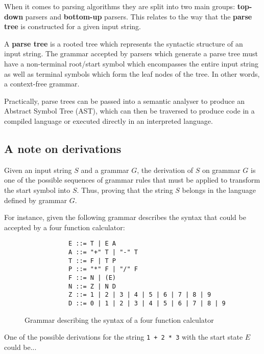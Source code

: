 When it comes to parsing algorithms they are split into two main groups: \textbf{top-down} parsers and \textbf{bottom-up} parsers. This relates to the way that the \textbf{parse tree} is constructed for a given input string.

A \textbf{parse tree} is a rooted tree which represents the syntactic structure of an input string. The grammar accepted by parsers which generate a parse tree must have a non-terminal root/start symbol which encompasses the entire input string as well as terminal symbols which form the leaf nodes of the tree. In other words, a context-free grammar.

Practically, parse trees can be passed into a semantic analyser to produce an Abstract Symbol Tree (AST), which can then be traversed to produce code in a compiled language or executed directly in an interpreted language.

\subsection{A note on derivations}

Given an input string $S$ and a grammar $G$, the derivation of $S$ on grammar $G$ is one of the possible sequences of grammar rules that must be applied to transform the start symbol into $S$. Thus, proving that the string $S$ belongs in the language defined by grammar $G$.

For instance, given the following grammar describes the syntax that could be accepted by a four function calculator:

\begin{figure}[h]
    \begin{center}
        \begin{verbatim}
            E ::= T | E A
            A ::= "+" T | "-" T
            T ::= F | T P
            P ::= "*" F | "/" F
            F ::= N | (E)
            N ::= Z | N D
            Z ::= 1 | 2 | 3 | 4 | 5 | 6 | 7 | 8 | 9
            D ::= 0 | 1 | 2 | 3 | 4 | 5 | 6 | 7 | 8 | 9
        \end{verbatim}
    \end{center}
    \vspace{-1.5em}
    \caption{\label{fig:2.3}Grammar describing the syntax of a four function calculator}
\end{figure}

\pagebreak

One of the possible derivations for the string \verb|1 + 2 * 3| with the start state $E$ could be...

